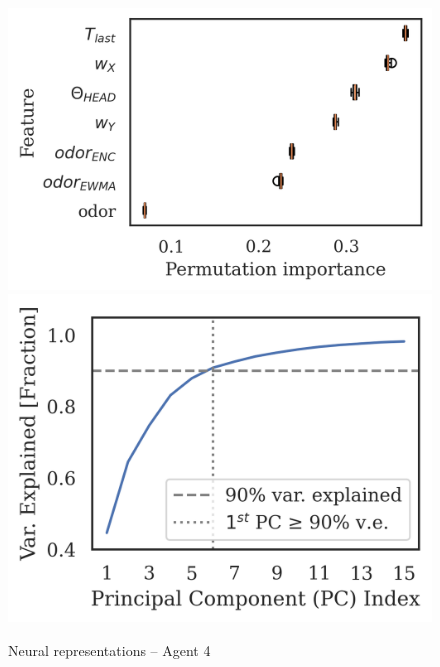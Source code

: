 \documentclass[5p,twocolumn,authoryear]{elsarticle}
\begin{document}
\begin{figure}[h!]
\begin{center}
\includegraphics[width=0.34\linewidth]{repr_541058.png}
\includegraphics[width=0.30\linewidth]{scree_541058.png}
\caption{Neural representations -- Agent 4}
\end{center}
\end{figure}
\end{document}
